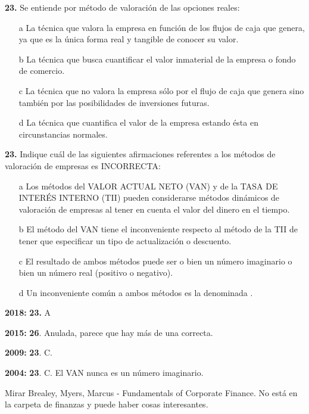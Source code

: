 \documentclass{nuevotema}
\begin{document}
\textbf{23.} Se entiende por método de valoración de las opciones reales:

\begin{enumerate}
    \item[a] La técnica que valora la empresa en función de los flujos de caja que genera, ya que es la única forma real y tangible de conocer su valor.
    \item[b] La técnica que busca cuantificar el valor inmaterial de la empresa o fondo de comercio.
    \item[c] La técnica que no valora la empresa sólo por el flujo de caja que genera sino también por las posibilidades de inversiones futuras.
    \item[d] La técnica que cuantifica el valor de la empresa estando ésta en circunstancias normales.
\end{enumerate}


\textbf{23.} Indique cuál de las siguientes afirmaciones referentes a los métodos de valoración de empresas es INCORRECTA:

\begin{enumerate}
    \item[a] Los métodos del VALOR ACTUAL NETO (VAN) y de la TASA DE INTERÉS INTERNO (TII) pueden considerarse métodos dinámicos de valoración de empresas al tener en cuenta el valor del dinero en el tiempo.
    \item[b] El método del VAN tiene el inconveniente respecto al método de la TII de tener que especificar un tipo de actualización o descuento.
    \item[c] El resultado de ambos métodos puede ser o bien un número imaginario o bien un número real (positivo o negativo).
    \item[d] Un inconveniente común a ambos métodos es la denominada .
\end{enumerate}

\notas

\textbf{2018:} \textbf{23.} A

\textbf{2015:} \textbf{26}. Anulada, parece que hay más de una correcta.

\textbf{2009:} \textbf{23}. C.

\textbf{2004:} \textbf{23}. C. El VAN nunca es un número imaginario.

Mirar Brealey, Myers, Marcus - Fundamentals of Corporate Finance. No está en la carpeta de finanzas y puede haber cosas interesantes.
\end{document}
